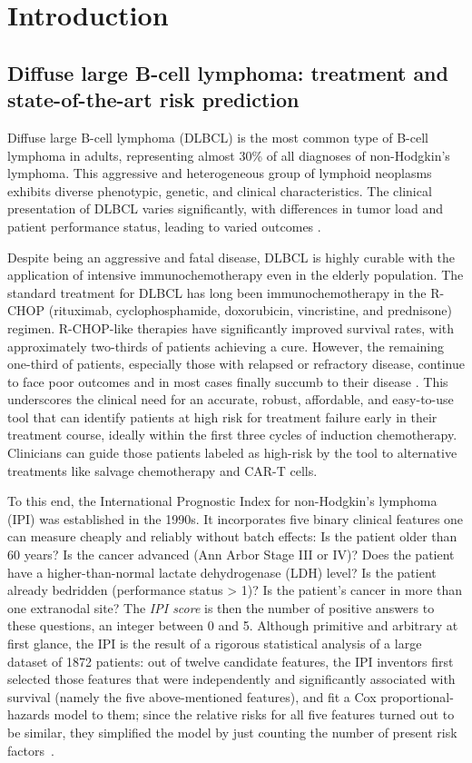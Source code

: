 \chapter{Introduction} \label{chap:intro}

\section{Diffuse large B-cell lymphoma: treatment and state-of-the-art risk prediction}

Diffuse large B-cell lymphoma (DLBCL) is the most common type of B-cell lymphoma in adults, 
representing almost 30\% of all diagnoses of non-Hodgkin's lymphoma. 
This aggressive and heterogeneous group of 
lymphoid neoplasms exhibits
diverse phenotypic, genetic, and clinical characteristics. The clinical presentation of 
DLBCL varies significantly, with differences in tumor load and patient performance status, leading 
to varied outcomes \cite{dlbcl-review21}.

Despite being an aggressive and fatal disease, DLBCL is highly curable with the 
application of intensive immunochemotherapy even in the elderly population. The standard treatment 
for DLBCL has long been immunochemotherapy in the R-CHOP (rituximab, cyclophosphamide, doxorubicin, 
vincristine, and prednisone) regimen. R-CHOP-like therapies
have significantly improved survival rates, with approximately two-thirds of patients 
achieving a cure. However, the remaining one-third of patients, especially 
those with relapsed or refractory disease, continue to face poor outcomes and in most cases finally 
succumb to their disease \citep{glass17}. This underscores the clinical 
need for an accurate, robust, affordable, and easy-to-use tool that can identify patients at high risk 
for treatment failure early in their treatment course, ideally within the first three cycles of 
induction chemotherapy. Clinicians can guide those patients labeled as high-risk by the tool to 
alternative treatments like salvage chemotherapy and CAR-T cells. 

To this end, the International Prognostic Index for non-Hodgkin's lymphoma (IPI) was established in 
the 1990s. It incorporates five binary clinical features one can measure cheaply and 
reliably without batch effects: Is the patient older than \num{60} years? Is the cancer advanced 
(Ann Arbor Stage III or IV)? Does the patient have a higher-than-normal lactate dehydrogenase (LDH) 
level? Is the patient already 
bedridden (performance status > 1)? Is the patient's cancer in more than one extranodal site? The 
\textit{IPI score} is then the number of positive answers to these questions, an integer between 0 
and 5. Although 
primitive and arbitrary at first glance, the IPI is the result of a rigorous statistical analysis 
of a large dataset of \num{1872} patients: out of twelve candidate features, the IPI inventors
first selected those features that were independently and significantly associated with survival 
(namely the five above-mentioned features), and fit a Cox proportional-hazards model to them;
since the relative risks for all five features turned out to be similar, they simplified the model 
by just counting the number of present risk factors~\cite{ipi93}. 

